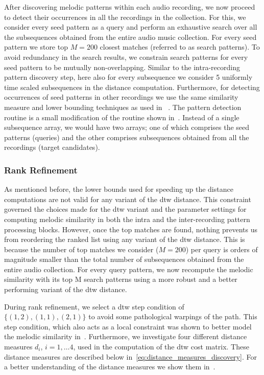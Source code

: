 After discovering melodic patterns within each audio recording, we now proceed to detect their occurrences in all the recordings in the collection. For this, we consider every seed pattern as a query and perform an exhaustive search over all the subsequences obtained from the entire audio music collection. For every seed pattern we store top $M=200$ closest matches (referred to as search patterns). To avoid redundancy in the search results, we constrain search patterns for every seed pattern to be mutually non-overlapping. Similar to the intra-recording pattern discovery step, here also for every subsequence we consider 5 uniformly  time scaled subsequences in the distance computation. Furthermore, for detecting occurrences of seed patterns in other recordings we use the same similarity measure and lower bounding techniques as used in ~. The pattern detection routine is a small modification of the routine shown in~. Instead of a single subsequence array, we would have two arrays; one of which comprises the seed patterns (queries) and the other comprises subsequences obtained from all the recordings (target candidates). 

\subsubsection{Rank Refinement}
\label{sec:rankRefinement}

As mentioned before, the lower bounds used for speeding up the distance computations are not valid for any variant of the \gls{dtw} distance. This constraint governed the choices made for the \gls{dtw} variant and the parameter settings for computing melodic similarity in both the intra and the inter-recording pattern processing blocks. However, once the top matches are found, nothing prevents us from reordering the ranked list using any variant of the \gls{dtw} distance. This is because the number of top matches we consider ($M=200$) per query is orders of magnitude smaller than the total number of subsequences obtained from the entire audio collection. For every query pattern, we now recompute the melodic similarity with its top M search patterns using a more robust and a better performing variant of the \gls{dtw} distance.

During rank refinement, we select a \gls{dtw} step condition of $\lbrace(1,2), (1,1), (2,1)\rbrace$ to avoid some pathological warpings of the path. This step condition, which also acts as a local constraint was shown to better model the melodic similarity in~. Furthermore, we investigate four different distance measures $d_i$, $i=1,\dots 4$, used in the computation of the \gls{dtw} cost matrix. These distance measures are described below in~\eqref{eq:distance_measures_discovery}. For a better understanding of the distance measures we show them in~.


